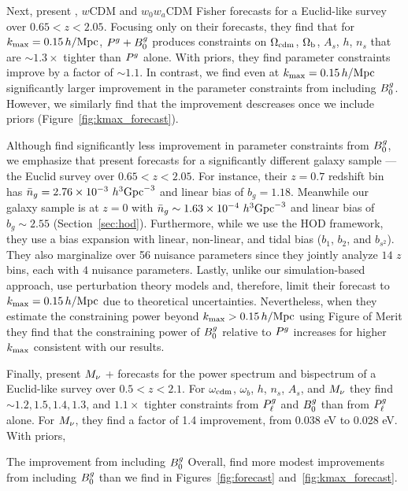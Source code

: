 Next, \cite{yankelevich2019} present \lcdm, $w$CDM and $w_0w_a$CDM Fisher
forecasts for a Euclid-like survey\cite{laureijs2011} over $0.65 < z < 2.05$.
Focusing only on their \lcdm forecasts, they find that for $k_{\rm max} = 0.15\,h/\mathrm{Mpc}$, 
$P^g+B^g_0$ produces constraints on $\Omega_{\rm cdm}$, $\Omega_{\rm b}$, $A_s$, $h$, $n_s$ 
that are ${\sim}1.3\times$ tighter than $P^g$ alone. With \planck priors, they 
find parameter constraints improve by a factor of ${\sim}1.1$. In contrast, we 
find even at $k_{\rm max}=0.15\,h/\mathrm{Mpc}$ significantly larger improvement in the parameter 
constraints from including $B^g_0$. However, we similarly find that the improvement 
descreases once we include \planck priors (Figure~\ref{fig:kmax_forecast}). 

Although \cite{yankelevich2019} find significantly less improvement in
parameter constraints from $B^g_0$, we emphasize that \cite{yankelevich2019}
present forecasts for a significantly different galaxy sample --- \ie the
Euclid survey over $0.65 < z < 2.05$. For instance, their $z = 0.7$ redshift
bin has $\bar{n}_g = 2.76 \times 10^{-3}~h^3{\rm Gpc}^{-3}$ and linear bias of
$b_g = 1.18$. Meanwhile our galaxy sample is at $z=0$ with $\bar{n}_g \sim 1.63\times
10^{-4}~h^3{\rm Gpc}^{-3}$ and linear bias of $b_g \sim 2.55$
(Section~\ref{sec:hod}). Furthermore, while we use the HOD framework, they use
a bias expansion with linear, non-linear, and tidal bias ($b_1$, $b_2$, and
$b_{s^2}$). They also marginalize over 56 nuisance parameters since they
jointly analyze $14$ $z$ bins, each with $4$ nuisance parameters.  Lastly,
unlike our simulation-based approach, \cite{yankelevich2019} use perturbation
theory models and, therefore, limit their forecast to $k_{\rm max} = 0.15\,h/\mathrm{Mpc}$ due
to theoretical uncertainties. Nevertheless, when they estimate the constraining
power beyond $k_{\rm max} > 0.15\,h/\mathrm{Mpc}$ using Figure of Merit they find that the
constraining power of $B^g_0$ relative to $P^g$ increases for higher $k_{\rm max}$
consistent with our results. 

Finally, \cite{chudaykin2019} present $M_\nu$ + \lcdm forecasts for the power
spectrum and bispectrum of a Euclid-like survey over $0.5 < z < 2.1$. For
$\omega_{\rm cdm}$, $\omega_b$, $h$, $n_s$, $A_s$, and $M_\nu$ they find
${\sim}1.2, 1.5, 1.4, 1.3$, and $1.1\times$ tighter constraints from $P^g_{\ell}$ and
$B^g_0$ than from $P^g_{\ell}$ alone. For $M_\nu$, they find a factor of 1.4 improvement, 
from 0.038 eV to 0.028 eV. With \planck priors, 

The improvement from including $B^g_0$ Overall,
\cite{chudaykin2019} find more modest improvements from including $B^g_0$ than
we find in Figures~\ref{fig:forecast} and~\ref{fig:kmax_forecast}. 


